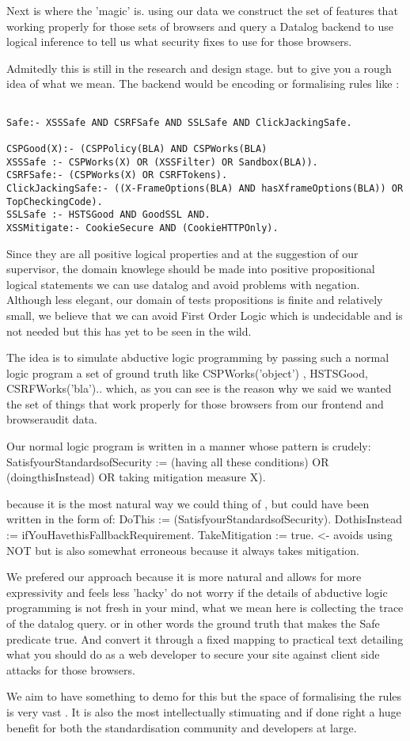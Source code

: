 Next is where the 'magic' is. using our data we construct the set of features that working properly for those sets of browsers and query
a Datalog backend to use logical inference to tell us what security fixes to use for those browsers.

Admitedly this is still in the research and design stage. but to give you a rough idea of what we mean. The backend would be encoding or formalising
rules like :

\begin{verbatim}
 
Safe:- XSSSafe AND CSRFSafe AND SSLSafe AND ClickJackingSafe.

CSPGood(X):- (CSPPolicy(BLA) AND CSPWorks(BLA)
XSSSafe :- CSPWorks(X) OR (XSSFilter) OR Sandbox(BLA)).
CSRFSafe:- (CSPWorks(X) OR CSRFTokens).
ClickJackingSafe:- ((X-FrameOptions(BLA) AND hasXframeOptions(BLA)) OR TopCheckingCode).
SSLSafe :- HSTSGood AND GoodSSL AND.
XSSMitigate:- CookieSecure AND (CookieHTTPOnly).

\end{verbatim}

Since they are all positive logical properties and at the suggestion of our supervisor, the domain knowlege should be made into positive propositional logical statements we can
use datalog and avoid problems with negation. Although less elegant, our domain of tests propositions is finite and relatively small, we believe that we 
can avoid First Order Logic which is undecidable and is not needed but this has yet to be seen in the wild.

The idea is to simulate abductive logic programming by passing such a normal logic program a set of ground truth like {CSPWorks('object') , HSTSGood, CSRFWorks('bla')..}
which, as you can see is the reason why we said we wanted the set of things that work properly for those browsers from our frontend and browseraudit data.

Our normal logic program is written in a manner whose pattern is crudely:
SatisfyourStandardsofSecurity := (having all these conditions) OR (doingthisInstead) OR taking mitigation measure X).

because it is the most natural way we could thing of , but could have been written in the form of:
DoThis := (SatisfyourStandardsofSecurity).
DothisInstead := ifYouHavethisFallbackRequirement.
TakeMitigation := true. <- avoids using NOT but is also somewhat erroneous because it always takes mitigation.

We prefered our approach because it is more natural and allows for more expressivity and feels less 'hacky' do not worry if the details of
abductive logic programming is not fresh in your mind, what we mean here is collecting the trace of the datalog query. or in other words the ground truth
that makes the Safe predicate true. And convert it through a fixed mapping to practical text detailing what you should do as a web developer to secure your site
against client side attacks for those browsers.

We aim to have something to demo for this but the space of formalising the rules is very vast . It is also the most intellectually stimuating 
and if done right a huge benefit for both the standardisation community and developers at large.
